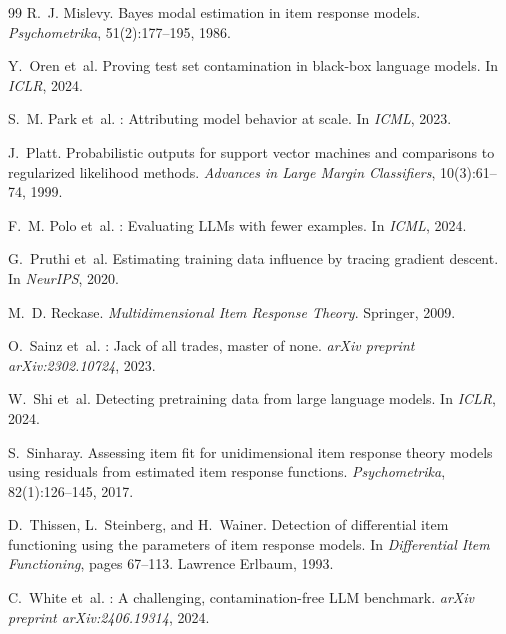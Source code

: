 \documentclass[11pt]{article}
\begin{document}
\begin{thebibliography}{99}
R.~J. Mislevy.
\newblock Bayes modal estimation in item response models.
\newblock \emph{Psychometrika}, 51(2):177--195, 1986.

Y.~Oren et~al.
\newblock Proving test set contamination in black-box language models.
\newblock In \emph{ICLR}, 2024.

S.~M. Park et~al.
: Attributing model behavior at scale.
\newblock In \emph{ICML}, 2023.

J.~Platt.
\newblock Probabilistic outputs for support vector machines and comparisons to regularized likelihood methods.
\newblock \emph{Advances in Large Margin Classifiers}, 10(3):61--74, 1999.

F.~M. Polo et~al.
: Evaluating {LLMs} with fewer examples.
\newblock In \emph{ICML}, 2024.

G.~Pruthi et~al.
\newblock Estimating training data influence by tracing gradient descent.
\newblock In \emph{NeurIPS}, 2020.

M.~D. Reckase.
\newblock \emph{Multidimensional Item Response Theory}.
\newblock Springer, 2009.

O.~Sainz et~al.
: Jack of all trades, master of none.
\newblock \emph{arXiv preprint arXiv:2302.10724}, 2023.

W.~Shi et~al.
\newblock Detecting pretraining data from large language models.
\newblock In \emph{ICLR}, 2024.

S.~Sinharay.
\newblock Assessing item fit for unidimensional item response theory models using residuals from estimated item response functions.
\newblock \emph{Psychometrika}, 82(1):126--145, 2017.

D.~Thissen, L.~Steinberg, and H.~Wainer.
\newblock Detection of differential item functioning using the parameters of item response models.
\newblock In \emph{Differential Item Functioning}, pages 67--113. Lawrence Erlbaum, 1993.

C.~White et~al.
: A challenging, contamination-free {LLM} benchmark.
\newblock \emph{arXiv preprint arXiv:2406.19314}, 2024.


\end{thebibliography}
\end{document}
